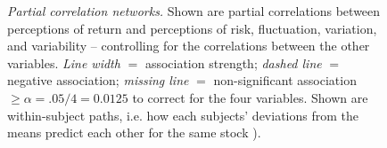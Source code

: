 \documentclass[a4paper,man, natbib,floatsintext]{apa6} %
\begin{document}
%
\begin{figure}[H] 
 \centering
  \caption{\textit{Partial correlation networks.} Shown are partial correlations between perceptions of return and perceptions of risk, fluctuation, variation, and variability --  controlling for the correlations between the other variables. \textit{Line width} $=$ association strength; \textit{dashed line} $=$ negative association; \textit{missing line} $=$ non-significant association  $\geq \alpha=.05/4=0.0125$ to correct for the four variables. Shown are within-subject paths, i.e. how each subjects' deviations from the means predict each other for the same stock \citep[contemporeanous effects, ][]{Epskamp2018}).}
  \label{fig:pcn}
\end{figure}

\end{document}

